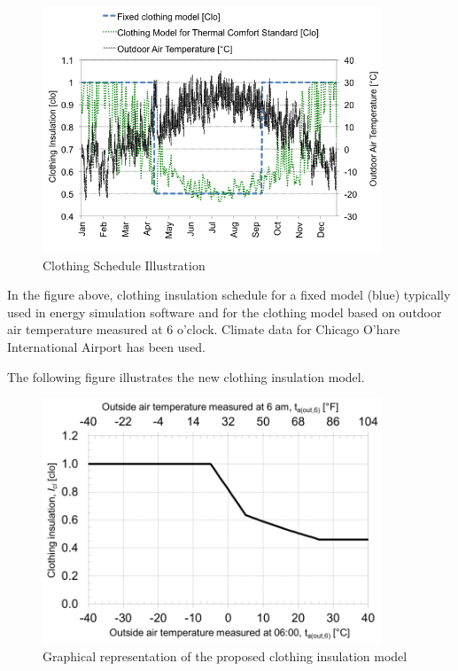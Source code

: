 \begin{figure}[hbtp] %
\centering
\includegraphics[width=0.9\textwidth, height=0.9\textheight, keepaspectratio=true]{media/image6825.png}
\caption{Clothing Schedule Illustration \protect \label{fig:clothing-schedule-illustration}}
\end{figure}

In the figure above, clothing insulation schedule for a fixed model (blue) typically used in energy simulation software and for the clothing model based on outdoor air temperature measured at 6 o'clock. Climate data for Chicago O'hare International Airport has been used.

The following figure illustrates the new clothing insulation model.

\begin{figure}[hbtp] %
\centering
\includegraphics[width=0.9\textwidth, height=0.9\textheight, keepaspectratio=true]{media/image6826.png}
\caption{Graphical representation of the proposed clothing insulation model \protect \label{fig:graphical-representation-of-the-proposed}}
\end{figure}

